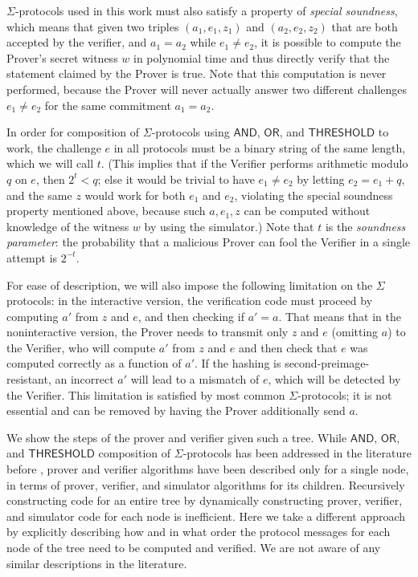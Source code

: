 \documentclass[11pt]{article}
\newcommand{\andnode}{\ensuremath{\mathsf{AND}}}
\newcommand{\ornode}{\ensuremath{\mathsf{OR}}}
\newcommand{\tnode}{\ensuremath{\mathsf{THRESHOLD}}}
\begin{document}
$\Sigma$-protocols used in this work must also satisfy a property of \emph{special soundness}, which means that given two triples $(a_1, e_1, z_1)$ and $(a_2, e_2, z_2)$ that are both accepted by the verifier, and $a_1=a_2$ while $e_1\neq e_2$, it is possible to compute the Prover's secret witness $w$ in polynomial time and thus directly verify that the statement claimed by the Prover is true.   Note that this computation is never performed, because the Prover will never actually answer two different challenges $e_1\neq e_2$ for the same commitment $a_1=a_2$. 

In order for composition of $\Sigma$-protocols using $\andnode$, $\ornode$, and $\tnode$ to work, the challenge $e$ in all protocols must be a binary string of the same length, which we will call $t$.  (This implies that if the Verifier performs arithmetic modulo $q$ on $e$, then $2^t<q$; else it would be trivial to have $e_1\neq e_2$ by letting $e_2=e_1+q$, and the same $z$ would work for both $e_1$ and $e_2$, violating the special soundness property mentioned above, because such $a, e_1, z$ can be computed without knowledge of the witness $w$ by using the simulator.)  Note that $t$ is the \emph{soundness parameter}: the probability that a malicious Prover can fool the Verifier in a single attempt is $2^{-t}$. 

 For ease of description, we will also impose the following limitation on the $\Sigma$ protocols: in the interactive version, the verification code must proceed by computing $a'$ from $z$ and $e$, and then checking if $a'=a$. That means that in the noninteractive version, the Prover needs to transmit only $z$ and $e$ (omitting $a$) to the Verifier, who will compute $a'$ from $z$ and $e$ and then check that $e$ was computed correctly as a function of $a'$. If the hashing is second-preimage-resistant, an incorrect $a'$ will lead to a mismatch of $e$, which will be detected by the Verifier. This limitation is satisfied by most common $\Sigma$-protocols; it is not essential and can be removed by having the Prover additionally send $a$.

We show the steps of the prover and verifier given such a tree. While $\andnode$, $\ornode$, and $\tnode$ composition of $\Sigma$-protocols has been addressed in the literature before \cite{CDS94}, prover and verifier algorithms have been described only for a single node, in terms of prover, verifier, and simulator algorithms for its children. Recursively constructing code for an entire tree by dynamically constructing prover, verifier, and simulator code for each node is inefficient. Here we take a different approach by explicitly describing how and in what order the protocol messages for each node of the tree need to be computed and verified. We are not aware of any similar descriptions in the literature.
\end{document}
